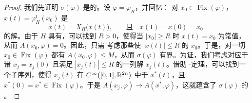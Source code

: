 \begin{proof}
我们先证明 $\sigma(\varphi)$ 是\trCompact{}的。设 $\varphi=\varphi_{H}$，并回忆：%
对 $x_{0}\in\operatorname{Fix}(\varphi)$，\trLoop{} $x(t)=\varphi_{H}^{t}(x_{0})$ 是
\begin{equation*}
\dot{x}(t)=X_{H}\bigl(x(t)\bigr),\qquad\text{且}\quad x(1)=x(0)=x_{0}.
\end{equation*}
的解。由于 $H$ 具有\trCompactSupport，可以找到 $R>0$，使得当%
$|x_{0}|\geq R$ 时 $x(t)=x_{0}$ 为常值，从而 $A(x_{0},\varphi)=0$。因此，只需%
考虑那些使 $|x(t)|\leq R$ 的\trFixedPoint{} $x_{0}$。于是，对一切%
$x_{0}\in\operatorname{Fix}(\varphi)$ 都有 $A(x_{0},\varphi)\leq M$，从而%
$\sigma(\varphi)$ 有界。为证\trCompactness，我们考虑对应于诸\trFixedPoint{}%
$x_{j}=x_{j}(0)$ 且满足 $|x_{j}(t)|\leq R$ 的一列解 $x_{j}(t)$。借助%
\trArzela-\trAscoli{}定理，可以找到一个子序列，使得 $x_{j}(t)$ 在%
$C^{\infty}\bigl([0,1],\mathbb{R}^{2n}\bigr)$ 中\trConverge{}于 $x^{*}(t)$，且%
$x^{*}(0)=x^{*}\in\operatorname{Fix}(\varphi)$。于是%
$A(x_{j},\varphi)\to A(x^{*},\varphi)$，这就蕴含了 $\sigma(\varphi)$ 的%
\trCompactness。


\end{proof}
